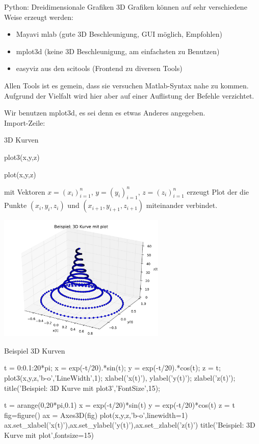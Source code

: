 \documentclass[hyperref={xetex}]{beamer}
\begin{document}
\begin{frame}[fragile]{Python: Dreidimensionale Grafiken}
3D Grafiken können auf sehr verschiedene Weise erzeugt werden:
  \begin{itemize}
    \item \alert{Mayavi mlab} (gute 3D Beschleunigung, GUI möglich, Empfohlen)
  \item \alert{mplot3d} (keine 3D Beschleunigung, am einfachsten zu Benutzen) 
  \item \alert{easyviz} aus den scitools (Frontend zu diversen Tools)
\end{itemize}
Allen Tools ist es gemein, dass sie versuchen Matlab-Syntax nahe zu kommen.
Aufgrund der Vielfalt wird hier aber auf einer Auflistung der Befehle verzichtet.

Wir benutzen \alert{mplot3d}, es sei denn es etwas Anderes angegeben.\\
Import-Zeile: 
\end{frame}
% 
% 
\begin{frame}[fragile]{3D Kurven}
  \begin{matlabin}
plot3(x,y,z)   
  \end{matlabin}
  \begin{pyin}
plot(x,y,z)   
  \end{pyin}

mit Vektoren $x=(x_i)_{i=1}^n$, $y=(y_i)_{i=1}^n$, $z=(z_i)_{i=1}^n$ 
erzeugt Plot der die Punkte
$(x_i,y_i,z_i)$ und $(x_{i+1},y_{i+1},z_{i+1})$ miteinander
verbindet. \\
\begin{center}\includegraphics[width=0.6\textwidth]{figures/plot3d_py}\end{center}
\end{frame}
% 
% 
\begin{frame}[fragile]{Beispiel 3D Kurven}
\begin{matlabin}
t = 0:0.1:20*pi;
x = exp(-t/20).*sin(t);
y = exp(-t/20).*cos(t);
z = t;
plot3(x,y,z,'b-o','LineWidth',1);
xlabel('x(t)'), ylabel('y(t)');
 zlabel('z(t)');
title('Beispiel: 3D Kurve mit plot3','FontSize',15);
\end{matlabin}
\begin{pyin}
t = arange(0,20*pi,0.1)
x = exp(-t/20)*sin(t)
y = exp(-t/20)*cos(t)
z = t
fig=figure()
ax = Axes3D(fig)
plot(x,y,z,'b-o',linewidth=1)
ax.set_xlabel('x(t)'),ax.set_ylabel('y(t)'),ax.set_zlabel('z(t)')
title('Beispiel: 3D Kurve mit plot',fontsize=15)  
\end{pyin}
\end{frame}
\end{document}
